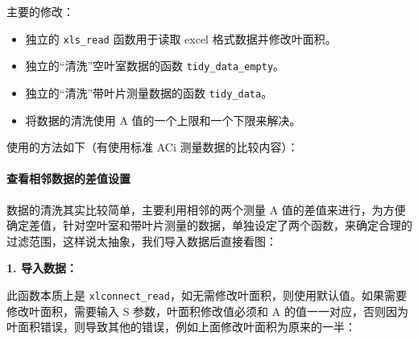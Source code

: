 \documentclass[
]{krantz}
\makeatletter
\newenvironment{Shaded}{\begin{snugshade}}{\end{snugshade}}
\newcommand{\AttributeTok}[1]{\textcolor[rgb]{0.77,0.63,0.00}{#1}}
\newcommand{\CommentTok}[1]{\textcolor[rgb]{0.56,0.35,0.01}{\textit{#1}}}
\newcommand{\DecValTok}[1]{\textcolor[rgb]{0.00,0.00,0.81}{#1}}
\newcommand{\FunctionTok}[1]{\textcolor[rgb]{0.00,0.00,0.00}{#1}}
\newcommand{\NormalTok}[1]{#1}
\newcommand{\OtherTok}[1]{\textcolor[rgb]{0.56,0.35,0.01}{#1}}
\newcommand{\SpecialCharTok}[1]{\textcolor[rgb]{0.00,0.00,0.00}{#1}}
\newcommand{\StringTok}[1]{\textcolor[rgb]{0.31,0.60,0.02}{#1}}
\providecommand{\tightlist}{%
  \setlength{\itemsep}{0pt}\setlength{\parskip}{0pt}}
\newenvironment{kframe}{%
\medskip{}
\setlength{\fboxsep}{.8em}
 \def\at@end@of@kframe{}%
 \ifinner\ifhmode%
  \def\at@end@of@kframe{\end{minipage}}%
  \begin{minipage}{\columnwidth}%
 \fi\fi%
 \def\FrameCommand##1{\hskip\@totalleftmargin \hskip-\fboxsep
 \colorbox{shadecolor}{##1}\hskip-\fboxsep
     \hskip-\linewidth \hskip-\@totalleftmargin \hskip\columnwidth}%
 \MakeFramed {\advance\hsize-\width
   \@totalleftmargin\z@ \linewidth\hsize
   \@setminipage}}%
 {\par\unskip\endMakeFramed%
 \at@end@of@kframe}
\renewenvironment{Shaded}{\begin{kframe}}{\end{kframe}}
\makeatother
\begin{document}
主要的修改：

\begin{itemize}
\tightlist
\item
  独立的 \texttt{xls\_read} 函数用于读取 excel 格式数据并修改叶面积。
\item
  独立的``清洗''空叶室数据的函数 \texttt{tidy\_data\_empty}。
\item
  独立的``清洗''带叶片测量数据的函数 \texttt{tidy\_data}。
\item
  将数据的清洗使用 A 值的一个上限和一个下限来解决。
\end{itemize}

使用的方法如下（有使用标准 ACi 测量数据的比较内容）：

\hypertarget{delta_max-check}{%
\paragraph{查看相邻数据的差值设置}\label{delta_max-check}}

数据的清洗其实比较简单，主要利用相邻的两个测量 A 值的差值来进行，为方便确定差值，针对空叶室和带叶片测量的数据，单独设定了两个函数，来确定合理的过滤范围，这样说太抽象，我们导入数据后直接看图：

\textbf{1. 导入数据：}

此函数本质上是 \texttt{xlconnect\_read}，如无需修改叶面积，则使用默认值。如果需要修改叶面积，需要输入 S 参数，叶面积修改值必须和 A 的值一一对应，否则因为叶面积错误，则导致其他的错误，例如上面修改叶面积为原来的一半：

\begin{Shaded}
\end{Shaded}
\end{document}
